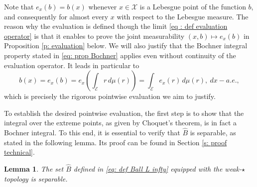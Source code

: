 \documentclass[a4paper, 11pt]{article}
\newtheorem{lem}{Lemma}
\theoremstyle{definition}
\newcommand{\R}{{\mathbb{R}}}
\newcommand{\cE}{{\mathcal{E}}}
\newcommand{\cX}{{\mathcal{X}}}
\newcommand{\theconvex}{C}
\begin{document}
{Note that \( e_x(b) = b(x) \) whenever \( x\in\cX \) is a Lebesgue point of the function \( b \), and consequently for almost every \( x \) with respect to the Lebesgue measure. The reason why the evaluation is defined though the limit \eqref{eq : def evaluation operator} is that it enables to prove the joint measurability $(x,b) \mapsto e_x(b)$ in Proposition \ref{p: evaluation} below. We will also justify that the Bochner integral property stated in \eqref{eq: prop Bochner} applies even without continuity of the evaluation operator. It leads in particular to
\[
b(x) = e_x(b) = e_x\left( \int_\cE r \, d\mu(r) \right) = \int_\cE e_x(r) \, d\mu(r), ~ dx-a.e.,
\]
which is precisely the rigorous pointwise evaluation we aim to justify.



To establish the desired pointwise evaluation, the first step is to show that the integral over the extreme points, as given by Choquet’s theorem, is in fact a Bochner integral. To this end, it is essential to verify that \( \widehat{B} \) is separable, as stated in the following lemma. Its proof can be found in Section \ref{s: proof technical}.



\begin{lem}{\label{l: B separable}}
The set $\widehat{B}$ defined in \eqref{eq: def Ball L infty} equipped with the weak-$\star$ topology is separable.  
\end{lem}


}
\end{document}
